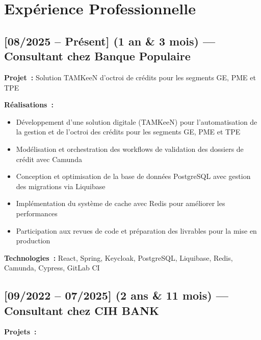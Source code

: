 \section*{Expérience Professionnelle}

\subsection*{[08/2025 -- Présent] (1 an \& 3 mois) --- Consultant chez Banque Populaire}
\vspace{4pt}
\textbf{Projet~:} Solution TAMKeeN d'octroi de crédits pour les segments GE, PME et TPE

\textbf{Réalisations~:}
\begin{itemize}
    \item Développement d'une solution digitale (TAMKeeN) pour l'automatisation de la gestion et de l'octroi des crédits pour les segments GE, PME et TPE
    \item Modélisation et orchestration des workflows de validation des dossiers de crédit avec Camunda
    \item Conception et optimisation de la base de données PostgreSQL avec gestion des migrations via Liquibase
    \item Implémentation du système de cache avec Redis pour améliorer les performances
    \item Participation aux revues de code et préparation des livrables pour la mise en production
\end{itemize}
\textbf{Technologies~:} React, Spring, Keycloak, PostgreSQL, Liquibase, Redis, Camunda, Cypress, GitLab CI

\subsection*{[09/2022 -- 07/2025] (2 ans \& 11 mois) --- Consultant chez CIH BANK}
\textbf{Projets~:}

